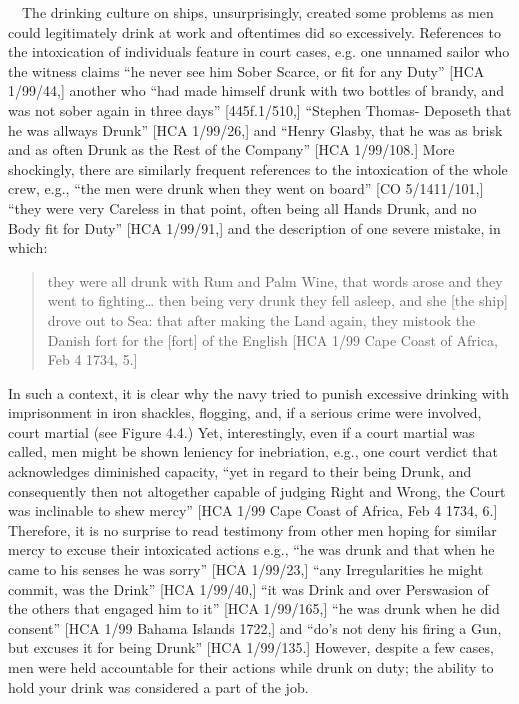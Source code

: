 \documentclass[12pt]{article}
\newenvironment{styleStandard}{\renewcommand\baselinestretch{1.0}\setlength\leftskip{0cm}\setlength\rightskip{0cm plus 1fil}\setlength\parindent{0cm}\setlength\parfillskip{0pt plus 1fil}\setlength\parskip{0in plus 1pt}\writerlistparindent\writerlistleftskip\leavevmode\normalfont\normalsize\writerlistlabel\ignorespaces}{\unskip\vspace{0in plus 1pt}\par}
\newcommand\writerlistleftskip{}
\newcommand\writerlistparindent{}
\newcommand\writerlistlabel{}
\begin{document}
\begin{styleStandard}
\ \ The drinking culture on ships, unsurprisingly, created some problems as men could legitimately drink at work and oftentimes did so excessively. References to the intoxication of individuals feature in court cases, e.g. one unnamed sailor who the witness claims “he never see him Sober Scarce, or fit for any Duty” [HCA 1/99/44,] another who “had made himself drunk with two bottles of brandy, and was not sober again in three days” [445f.1/510,] “Stephen Thomas- Deposeth that he was allways Drunk” [HCA 1/99/26,] and “Henry Glasby, that he was as brisk and as often Drunk as the Rest of the Company” [HCA 1/99/108.] More shockingly, there are similarly frequent references to the intoxication of the whole crew, e.g., “the men were drunk when they went on board” [CO 5/1411/101,] “they were very Careless in that point, often being all Hands Drunk, and no Body fit for Duty” [HCA 1/99/91,] and the description of one severe mistake, in which: 
\end{styleStandard}


\begin{quotation}
they were all drunk with Rum and Palm Wine, that words arose and they went to fighting… then being very drunk they fell asleep, and she [the ship] drove out to Sea: that after making the Land again, they mistook the Danish fort for the [fort] of the English [HCA 1/99 Cape Coast of Africa, Feb 4 1734, 5.]

\end{quotation}
\begin{styleStandard}
In such a context, it is clear why the navy tried to punish excessive drinking with imprisonment in iron shackles, flogging, and, if a serious crime were involved, court martial (see Figure 4.4.) Yet, interestingly, even if a court martial was called, men might be shown leniency for inebriation, e.g., one court verdict that acknowledges diminished capacity, “yet in regard to their being Drunk, and consequently then not altogether capable of judging Right and Wrong, the Court was inclinable to shew mercy” [HCA 1/99 Cape Coast of Africa, Feb 4 1734, 6.] Therefore, it is no surprise to read testimony from other men hoping for similar mercy to excuse their intoxicated actions e.g., “he was drunk and that when he came to his senses he was sorry” [HCA 1/99/23,] “any Irregularities he might commit, was the Drink” [HCA 1/99/40,] “it was Drink and over Perswasion of the others that engaged him to it” [HCA 1/99/165,] “he was drunk when he did consent” [HCA 1/99 Bahama Islands 1722,] and “do’s not deny his firing a Gun, but excuses it for being Drunk” [HCA 1/99/135.] However, despite a few cases, men were held accountable for their actions while drunk on duty; the ability to hold your drink was considered a part of the job. 
\end{styleStandard}
\end{document}
